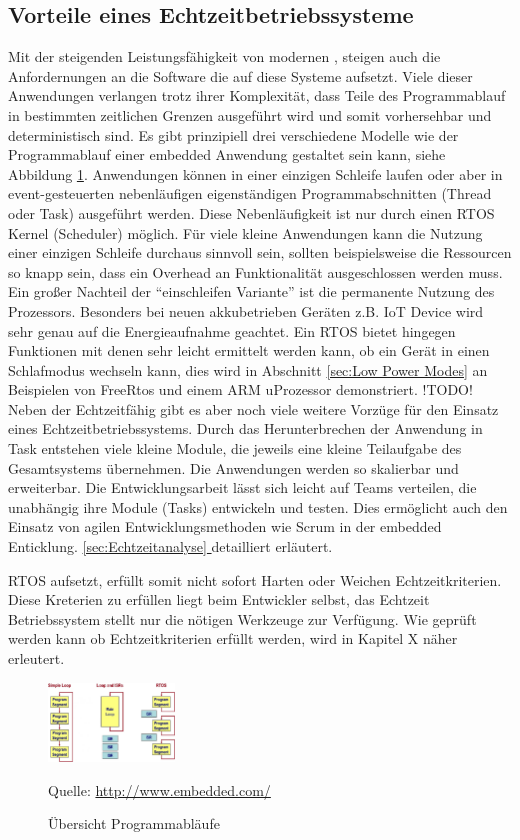 \documentclass[ngerman]{seminarvorlage}
\newcommand*{\fullref}[1]{\hyperref[{#1}]{\autoref*{#1} \nameref*{#1}}} %
\newcommand*{\quelle}{%
  \footnotesize Quelle: 
}
\begin{document}
\subsection{Vorteile eines Echtzeitbetriebssysteme}
Mit der steigenden Leistungsfähigkeit von modernen \muProzessoren, steigen auch die Anfordernungen an die Software die auf diese Systeme aufsetzt. Viele dieser Anwendungen verlangen trotz ihrer Komplexität, dass Teile des Programmablauf in bestimmten zeitlichen Grenzen ausgeführt wird und somit vorhersehbar und deterministisch sind. Es gibt prinzipiell drei verschiedene Modelle wie der Programmablauf einer embedded Anwendung gestaltet sein kann, siehe Abbildung \ref{fig:Programmablauf}. Anwendungen können in einer einzigen Schleife laufen oder aber in event-gesteuerten nebenläufigen eigenständigen Programmabschnitten (Thread oder Task) ausgeführt werden. Diese Nebenläufigkeit ist nur durch einen RTOS Kernel (Scheduler) möglich. Für viele kleine Anwendungen kann die Nutzung einer einzigen Schleife durchaus sinnvoll sein, sollten beispielsweise die Ressourcen so knapp sein, dass ein Overhead an Funktionalität ausgeschlossen werden muss. Ein großer Nachteil der "`einschleifen Variante"' ist die permanente Nutzung des Prozessors. Besonders bei neuen akkubetrieben Geräten z.B. IoT Device wird sehr genau auf die Energieaufnahme geachtet. Ein RTOS bietet hingegen Funktionen mit denen sehr leicht ermittelt werden kann, ob ein Gerät in einen Schlafmodus wechseln kann, dies wird in Abschnitt \ref{sec:Low Power Modes} an Beispielen von FreeRtos und einem ARM uProzessor demonstriert. 
\newline
!TODO!
\newline
Neben der Echtzeitfähig gibt es aber noch viele weitere Vorzüge für den Einsatz eines Echtzeitbetriebssystems.  
Durch das Herunterbrechen der Anwendung in Task entstehen viele kleine Module, die jeweils eine kleine Teilaufgabe des Gesamtsystems übernehmen. Die Anwendungen werden so skalierbar und erweiterbar. Die Entwicklungsarbeit lässt sich leicht auf Teams verteilen, die unabhängig ihre Module (Tasks) entwickeln und testen. Dies ermöglicht auch den Einsatz von agilen Entwicklungsmethoden wie Scrum in der embedded Enticklung.   
\fullref{sec:Echtzeitanalyse} detailliert erläutert.    

RTOS aufsetzt, erfüllt somit nicht sofort Harten oder Weichen Echtzeitkriterien. Diese Kreterien zu erfüllen liegt beim Entwickler selbst, das Echtzeit Betriebssystem stellt nur die nötigen Werkzeuge zur Verfügung. Wie geprüft werden kann ob Echtzeitkriterien erfüllt werden, wird in Kapitel X näher erleutert.  
\begin{figure}
	\centering
		\includegraphics[width=0.3\textwidth]{Pictures/EmbeddedCom/cwrtos2f5c.jpg}
	\caption{Übersicht Programmabläufe}
	\quelle\url{http://www.embedded.com/}
	\label{fig:Programmablauf}
\end{figure}
\end{document}

